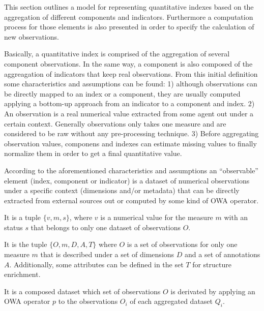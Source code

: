 This section outlines a model for representing quantitative indexes based on the aggregation 
of different components and indicators. Furthermore a computation process for those elements is 
also presented in order to specify the calculation of new observations.

Basically, a quantitative index is comprised of the aggregation of several component observations. In the same way, 
a component is also composed of the aggreagation of indicators that keep real observations. From this initial definition 
some characteristics and assumptions can be found: 1) although observations can be directly mapped to an index or a component, they 
are usually computed applying a bottom-up approach from an indicator to a component and index. 2) An observation is 
a real numerical value extracted from some agent out under a certain context. Generally observations only takes one measure and are considered 
to be raw without any pre-processing technique. 3) Before aggregating observation values, componens and indexes can 
estimate missing values to finally normalize them in order to get a final quantitative value.

According to the aforementioned characteristics and assumptions an ``observable'' element (index, component or indicator) is a 
dataset of numerical observations under a specific context (dimensions and/or metadata) that can be directly extracted from external 
sources out or computed by some kind of OWA operator. 

\begin{definition}[Observation-$o$]\upshape
It is a tuple $\{v,m,s\}$, where $v$ is a numerical value for the measure $m$ with an status $s$ that belongs to 
only one dataset of observations $O$. 
\end{definition}


\begin{definition}[Dataset-$q$]\upshape
It is the tuple $\{O,m,D,A,T\}$ where $O$ is a set of observations for only one measure $m$ that is described under 
a set of dimensions $D$ and a set of annotations $A$. Additionally, some attributes can be defined in the set $T$ for structure enrichment. 
\end{definition}


\begin{definition}\upshape
It is a composed dataset which set of observations $O$ is derivated by applying 
an OWA operator $p$ to the observations $O_i$ of each aggregated dataset $Q_i$.
\end{definition}

